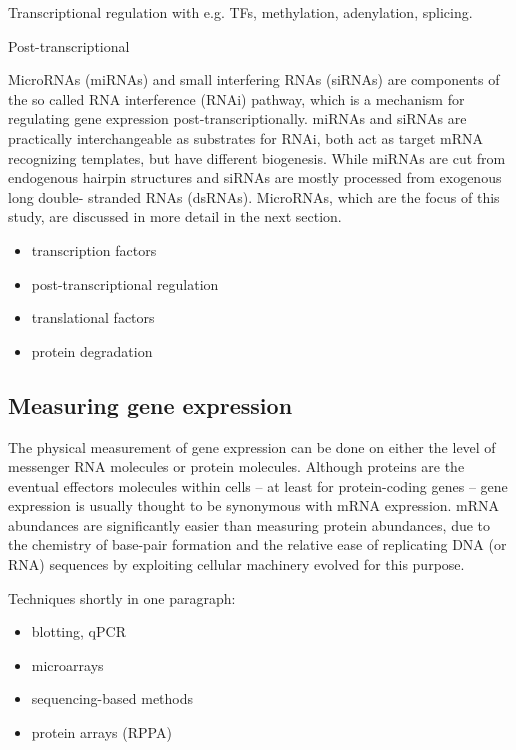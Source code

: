 Transcriptional regulation with e.g. TFs, methylation, adenylation, splicing.

Post-transcriptional

MicroRNAs (miRNAs) and small interfering RNAs (siRNAs) are components of the
so called RNA interference (RNAi) pathway, which is a mechanism for regulating
gene expression post-transcriptionally. miRNAs and siRNAs are practically
interchangeable as substrates for RNAi, both act as target mRNA recognizing
templates, but have different biogenesis. While miRNAs are cut from endogenous
hairpin structures and siRNAs are mostly processed from exogenous long double-
stranded RNAs (dsRNAs). \cite{Du2005} MicroRNAs, which are the focus of this study,
are discussed in more detail in the next section.


\begin{itemize}
  \item transcription factors
  \item post-transcriptional regulation
  \item translational factors
  \item protein degradation
\end{itemize}




\subsection{Measuring gene expression}\label{measurement-of-gene-expression}

The physical measurement of gene expression can be done on either the level of
messenger RNA molecules or protein molecules. Although proteins are the
eventual effectors molecules within cells -- at least for protein-coding genes
-- gene expression is usually thought to be synonymous with mRNA expression.
mRNA abundances are significantly easier than
measuring protein abundances, due to the chemistry of base-pair formation and
the relative ease of replicating DNA (or RNA) sequences by exploiting cellular
machinery evolved for this purpose.

Techniques shortly in one paragraph:
\begin{itemize}
  \item blotting, qPCR
  \item microarrays
  \item sequencing-based methods
  \item protein arrays (RPPA)
\end{itemize}




